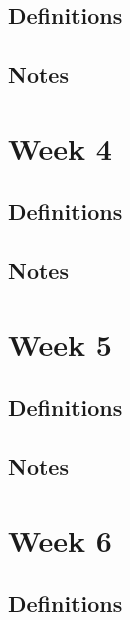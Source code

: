 \documentclass[12pt]{article}
\begin{document}
\subsection{Definitions}
\subsection{Notes}





\section{Week 4}

\subsection{Definitions}
\subsection{Notes}





\section{Week 5}

\subsection{Definitions}
\subsection{Notes}





\section{Week 6}

\subsection{Definitions}
\end{document}
